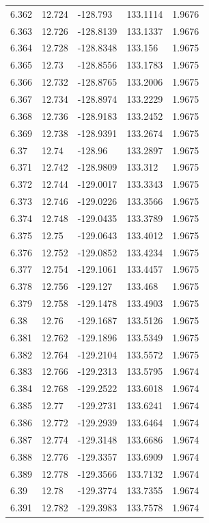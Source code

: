 \begin{tabular}{lllll}
6.362 & 12.724 & -128.793 & 133.1114 & 1.9676 \\
6.363 & 12.726 & -128.8139 & 133.1337 & 1.9676 \\
6.364 & 12.728 & -128.8348 & 133.156 & 1.9675 \\
6.365 & 12.73 & -128.8556 & 133.1783 & 1.9675 \\
6.366 & 12.732 & -128.8765 & 133.2006 & 1.9675 \\
6.367 & 12.734 & -128.8974 & 133.2229 & 1.9675 \\
6.368 & 12.736 & -128.9183 & 133.2452 & 1.9675 \\
6.369 & 12.738 & -128.9391 & 133.2674 & 1.9675 \\
6.37 & 12.74 & -128.96 & 133.2897 & 1.9675 \\
6.371 & 12.742 & -128.9809 & 133.312 & 1.9675 \\
6.372 & 12.744 & -129.0017 & 133.3343 & 1.9675 \\
6.373 & 12.746 & -129.0226 & 133.3566 & 1.9675 \\
6.374 & 12.748 & -129.0435 & 133.3789 & 1.9675 \\
6.375 & 12.75 & -129.0643 & 133.4012 & 1.9675 \\
6.376 & 12.752 & -129.0852 & 133.4234 & 1.9675 \\
6.377 & 12.754 & -129.1061 & 133.4457 & 1.9675 \\
6.378 & 12.756 & -129.127 & 133.468 & 1.9675 \\
6.379 & 12.758 & -129.1478 & 133.4903 & 1.9675 \\
6.38 & 12.76 & -129.1687 & 133.5126 & 1.9675 \\
6.381 & 12.762 & -129.1896 & 133.5349 & 1.9675 \\
6.382 & 12.764 & -129.2104 & 133.5572 & 1.9675 \\
6.383 & 12.766 & -129.2313 & 133.5795 & 1.9674 \\
6.384 & 12.768 & -129.2522 & 133.6018 & 1.9674 \\
6.385 & 12.77 & -129.2731 & 133.6241 & 1.9674 \\
6.386 & 12.772 & -129.2939 & 133.6464 & 1.9674 \\
6.387 & 12.774 & -129.3148 & 133.6686 & 1.9674 \\
6.388 & 12.776 & -129.3357 & 133.6909 & 1.9674 \\
6.389 & 12.778 & -129.3566 & 133.7132 & 1.9674 \\
6.39 & 12.78 & -129.3774 & 133.7355 & 1.9674 \\
6.391 & 12.782 & -129.3983 & 133.7578 & 1.9674 \\

\end{tabular}
